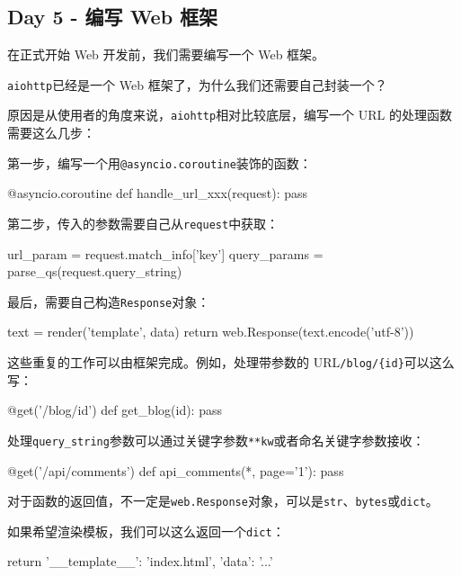 \hypertarget{day-5---ux7f16ux5199-web-ux6846ux67b6}{%
\subsection{Day 5 - 编写 Web
框架}\label{day-5---ux7f16ux5199-web-ux6846ux67b6}}

在正式开始 Web 开发前，我们需要编写一个 Web 框架。

\texttt{aiohttp}已经是一个 Web 框架了，为什么我们还需要自己封装一个？

原因是从使用者的角度来说，\texttt{aiohttp}相对比较底层，编写一个 URL
的处理函数需要这么几步：

第一步，编写一个用\texttt{@asyncio.coroutine}装饰的函数：

\begin{pythoncode}
@asyncio.coroutine
def handle_url_xxx(request):
    pass
\end{pythoncode}

第二步，传入的参数需要自己从\texttt{request}中获取：

\begin{pythoncode}
url_param = request.match_info['key']
query_params = parse_qs(request.query_string)
\end{pythoncode}

最后，需要自己构造\texttt{Response}对象：

\begin{pythoncode}
text = render('template', data)
return web.Response(text.encode('utf-8'))
\end{pythoncode}

这些重复的工作可以由框架完成。例如，处理带参数的
URL\texttt{/blog/\{id\}}可以这么写：

\begin{pythoncode}
@get('/blog/{id}')
def get_blog(id):
    pass
\end{pythoncode}

处理\texttt{query\_string}参数可以通过关键字参数\texttt{**kw}或者命名关键字参数接收：

\begin{pythoncode}
@get('/api/comments')
def api_comments(*, page='1'):
    pass
\end{pythoncode}

对于函数的返回值，不一定是\texttt{web.Response}对象，可以是\texttt{str}、\texttt{bytes}或\texttt{dict}。

如果希望渲染模板，我们可以这么返回一个\texttt{dict}：

\begin{pythoncode}
return {
    '__template__': 'index.html',
    'data': '...'
}
\end{pythoncode}

